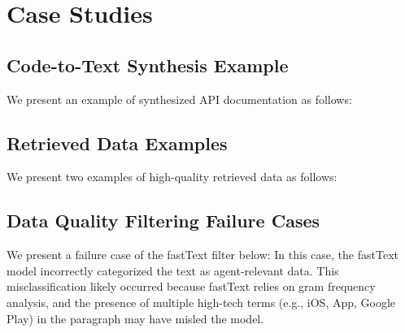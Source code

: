 \section{Case Studies}
\label{app:case}

\subsection{Code-to-Text Synthesis Example}

We present an example of synthesized API documentation as follows:
\vspace{1ex}

\subsection{Retrieved Data Examples}

We present two examples of high-quality retrieved data as follows:

\vspace{1ex}

\vspace{1ex}

\subsection{Data Quality Filtering Failure Cases}

% 
We present a failure case of the fastText filter below:
\vspace{1ex}
In this case, the fastText model incorrectly categorized the text as agent-relevant data. This misclassification likely occurred because fastText relies on gram frequency analysis, and the presence of multiple high-tech terms (e.g., iOS, App, Google Play) in the paragraph may have misled the model.
